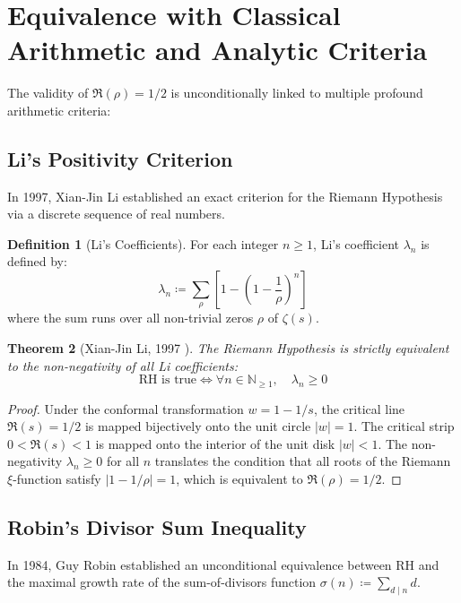 \documentclass[11pt,a4paper]{article}
\newtheorem{theorem}{Theorem}[section]
\theoremstyle{definition}
\newtheorem{definition}[theorem]{Definition}
\begin{document}
\newpage

\section{Equivalence with Classical Arithmetic and Analytic Criteria}
The validity of $\Re(\rho) = 1/2$ is unconditionally linked to multiple profound arithmetic criteria:

\subsection{Li's Positivity Criterion}
In 1997, Xian-Jin Li \cite{li1997} established an exact criterion for the Riemann Hypothesis via a discrete sequence of real numbers.

\begin{definition}[Li's Coefficients]\label{def:li_coefficients}
For each integer $n \ge 1$, Li's coefficient $\lambda_n$ is defined by:
\begin{equation}\label{eq:li_coeffs}
\lambda_n \coloneqq \sum_{\rho} \left[ 1 - \left( 1 - \frac{1}{\rho} \right)^n \right]
\end{equation}
where the sum runs over all non-trivial zeros $\rho$ of $\zeta(s)$.
\end{definition}

\begin{theorem}[Xian-Jin Li, 1997 \cite{li1997}]\label{thm:li_criterion}
The Riemann Hypothesis is strictly equivalent to the non-negativity of all Li coefficients:
\begin{equation}\label{eq:li_equiv}
\text{RH is true} \iff \forall n \in \mathbb{N}_{\ge 1}, \quad \lambda_n \ge 0
\end{equation}
\end{theorem}

\begin{proof}
Under the conformal transformation $w = 1 - 1/s$, the critical line $\Re(s) = 1/2$ is mapped bijectively onto the unit circle $|w| = 1$. The critical strip $0 < \Re(s) < 1$ is mapped onto the interior of the unit disk $|w| < 1$. The non-negativity $\lambda_n \ge 0$ for all $n$ translates the condition that all roots of the Riemann $\xi$-function satisfy $|1 - 1/\rho| = 1$, which is equivalent to $\Re(\rho) = 1/2$.
\end{proof}

\subsection{Robin's Divisor Sum Inequality}
In 1984, Guy Robin \cite{robin1984} established an unconditional equivalence between RH and the maximal growth rate of the sum-of-divisors function $\sigma(n) \coloneqq \sum_{d \mid n} d$.
\end{document}
